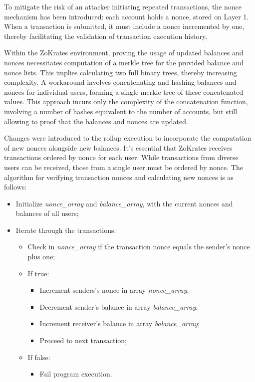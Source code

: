 To mitigate the risk of an attacker initiating repeated transactions, the nonce mechanism has been introduced: each account holds a nonce, stored on Layer 1. When a transaction is submitted, it must include a nonce incremented by one, thereby facilitating the validation of transaction execution history.

Within the ZoKrates environment, proving the usage of updated balances and nonces necessitates computation of a merkle tree for the provided balance and nonce lists. This implies calculating two full binary trees, thereby increasing complexity. A workaround involves concatenating and hashing balances and nonces for individual users, forming a single merkle tree of these concatenated values. This approach incurs only the complexity of the concatenation function, involving a number of hashes equivalent to the number of accounts, but still allowing to proof that the balances and nonces are updated.

Changes were introduced to the rollup execution to incorporate the computation of new nonces alongside new balances. It's essential that ZoKrates receives transactions ordered by nonce for each user. While transactions from diverse users can be received, those from a single user must be ordered by nonce. The algorithm for verifying transaction nonces and calculating new nonces is as follows:
\begin{itemize}
	\item Initialize \textit{nonce\_array} and \textit{balance\_array}, with the current nonces and balances of all users;
	\item Iterate through the transactions:
	      \begin{itemize}
		      \item Check in \textit{nonce\_array} if the transaction nonce equals the sender's nonce plus one;
		      \item If true:
		            \begin{itemize}
			            \item Increment senders's nonce in array \textit{nonce\_array};
			            \item Decrement sender's balance in array \textit{balance\_array};
			            \item Increment receiver's balance in array \textit{balance\_array};
			            \item Proceed to next transaction;
		            \end{itemize}
		      \item If false:
		            \begin{itemize}
			            \item Fail program execution.
		            \end{itemize}
	      \end{itemize}
\end{itemize}


